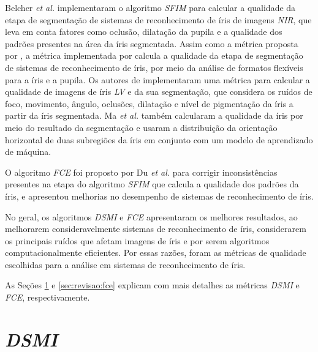\par Belcher \textit{et al.} \cite{belcher2008} implementaram o algoritmo \textit{\acrfull{SFIM}} para calcular a qualidade da etapa de segmentação de sistemas de reconhecimento de íris de imagens \textit{\acrshort{NIR}}, que leva em conta fatores como oclusão, dilatação da pupila e a qualidade dos padrões presentes na área da íris segmentada. Assim como a métrica proposta por \cite{belcher2008}, a métrica implementada por \cite{mottalli2009-DSMI-30} calcula a qualidade da etapa de segmentação de sistemas de reconhecimento de íris, por meio da análise de formatos flexíveis para a íris e a pupila. Os autores de \cite{proenca2011} implementaram uma métrica para calcular a qualidade de imagens de íris \textit{\acrshort{LV}} e da sua segmentação, que considera os ruídos de foco, movimento, ângulo, oclusões, dilatação e nível de pigmentação da íris a partir da íris segmentada. Ma \textit{et al.} \cite{ma2003-FIM-7} também calcularam a qualidade da íris por meio do resultado da segmentação e usaram a distribuição da orientação horizontal de duas subregiões da íris em conjunto com um modelo de aprendizado de máquina.

\par O algoritmo \textit{\acrshort{FCE}} foi proposto por Du \textit{et al.} \cite{du2010} para corrigir inconsistências presentes na etapa do algoritmo \textit{\acrshort{SFIM}} que calcula a qualidade dos padrões da íris, e apresentou melhorias no desempenho de sistemas de reconhecimento de íris.

\par No geral, os algoritmos \textit{\acrshort{DSMI}} e \textit{\acrshort{FCE}} apresentaram os melhores resultados, ao melhorarem consideravelmente sistemas de reconhecimento de íris, considerarem os principais ruídos que afetam imagens de íris e por serem algoritmos computacionalmente eficientes. Por essas razões, foram as métricas de qualidade escolhidas para a análise em sistemas de reconhecimento de íris.

\par As Seções \ref{sec:revisao:dsmi} e \ref{sec:revisao:fce} explicam com mais detalhes as métricas \textit{\acrshort{DSMI}} e \textit{\acrshort{FCE}}, respectivamente.


\section{\textit{\acrfull{DSMI}}} \label{sec:revisao:dsmi}

